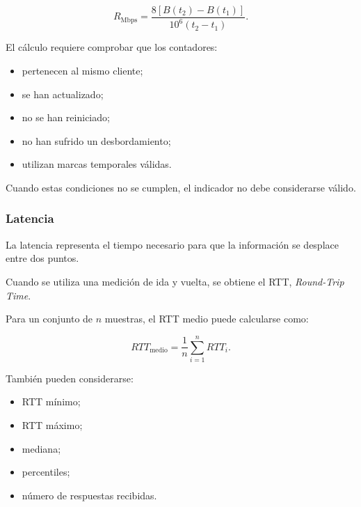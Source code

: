 \[
    R_{\mathrm{Mbps}}
    =
    \frac{
        8
        \left[
            B(t_2)
            -
            B(t_1)
        \right]
    }{
        10^6
        \left(
            t_2
            -
            t_1
        \right)
    }.
\]

El cálculo requiere comprobar que los contadores:

\begin{itemize}
    \item pertenecen al mismo cliente;

    \item se han actualizado;

    \item no se han reiniciado;

    \item no han sufrido un desbordamiento;

    \item utilizan marcas temporales válidas.
\end{itemize}

Cuando estas condiciones no se cumplen, el indicador no debe
considerarse válido.


\subsubsection*{Latencia}

La latencia representa el tiempo necesario para que la información se
desplace entre dos puntos.

Cuando se utiliza una medición de ida y vuelta, se obtiene el RTT,
\textit{Round-Trip Time}.

Para un conjunto de \(n\) muestras, el RTT medio puede calcularse como:

\[
    RTT_{\mathrm{medio}}
    =
    \frac{
        1
    }{
        n
    }
    \sum_{i=1}^{n}
    RTT_i.
\]

También pueden considerarse:

\begin{itemize}
    \item RTT mínimo;

    \item RTT máximo;

    \item mediana;

    \item percentiles;

    \item número de respuestas recibidas.
\end{itemize}

